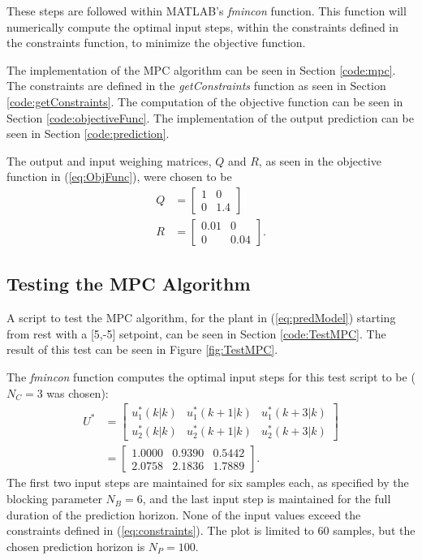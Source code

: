 \documentclass[12pt]{article}
\begin{document}
These steps are followed within MATLAB's \textit{fmincon} function. This function will numerically compute the optimal input steps, within the constraints defined in the constraints function, to minimize the objective function.

The implementation of the MPC algorithm can be seen in Section \ref{code:mpc}. The constraints are defined in the \textit{getConstraints} function as seen in Section \ref{code:getConstraints}. The computation of the objective function can be seen in Section \ref{code:objectiveFunc}. The implementation of the output prediction can be seen in Section \ref{code:prediction}.

The output and input weighing matrices, $Q$ and $R$, as seen in the objective function in (\ref{eq:ObjFunc}), were chosen to be
\begin{subequations}
\begin{align}
Q &=
\begin{bmatrix}
1 & 0 \\
0 & 1.4
\end{bmatrix} \\[0.5ex]
R &=
\begin{bmatrix}
0.01 & 0 \\
0 & 0.04
\end{bmatrix}.
\end{align}
\end{subequations}

\subsection{Testing the MPC Algorithm}

A script to test the MPC algorithm, for the plant in (\ref{eq:predModel}) starting from rest with a [5,-5] setpoint, can be seen in Section \ref{code:TestMPC}. The result of this test can be seen in Figure \ref{fig:TestMPC}.

The \textit{fmincon} function computes the optimal input steps for this test script to be ($N_C=3$ was chosen):
\begin{align}
U^* &= \begin{bmatrix}
u^*_1(k|k) & u^*_1(k+1|k) & u^*_1(k+3|k) \\
u^*_2(k|k) & u^*_2(k+1|k) & u^*_2(k+3|k)
\end{bmatrix} \\[0.5ex]
&= \begin{bmatrix}
1.0000&    0.9390&    0.5442 \\
2.0758&    2.1836&    1.7889
\end{bmatrix}. \nonumber
\end{align}
The first two input steps are maintained for six samples each, as specified by the blocking parameter $N_B=6$, and the last input step is maintained for the full duration of the prediction horizon. None of the input values exceed the constraints defined in (\ref{eq:constraints}). The plot is limited to 60 samples, but the chosen prediction horizon is $N_P=100$.
\end{document}
